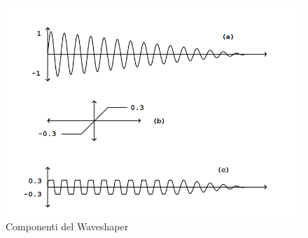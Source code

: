 \begin{figure}[!h] 
    \centering 
    \includegraphics[width=0.8\columnwidth]{immagini/cap2/waveshaper_graph.png}
    \caption{Componenti del Waveshaper}
\end{figure}

